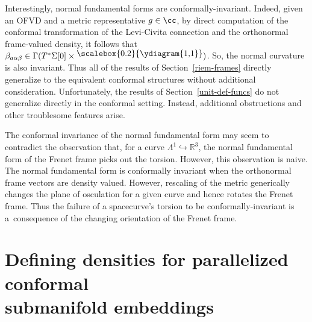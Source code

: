 Interestingly, normal fundamental forms are conformally-invariant. Indeed, given an OFVD and a metric representative $g \in \cc$, by direct computation of the conformal transformation of the Levi-Civita connection and the orthonormal frame-valued density, it follows that $\beta_{a \alpha \beta} \in \Gamma(T^* \Sigma[0] \times \raisebox{3pt}{\scalebox{0.2}{\ydiagram{1,1}}})$. So, the normal curvature is also invariant. Thus all of the results of Section~\ref{riem-frames} directly generalize to the equivalent conformal structures without additional consideration. Unfortunately, the results of Section~\ref{unit-def-funcs} do not generalize directly in the conformal setting. Instead, additional obstructions and other troublesome features arise.

\begin{Remark}
The conformal invariance of the normal fundamental form may seem to contradict the observation that, for a curve $\Lambda^1 \hookrightarrow \mathbb{R}^3$, the normal fundamental form of the Frenet frame picks out the torsion. However, this observation is naive. The normal fundamental form is conformally invariant when the orthonormal frame vectors are density valued. However, rescaling of the metric generically changes the plane of osculation for a given curve and hence rotates the Frenet frame. Thus the failure of a spacecurve's torsion to be conformally-invariant is a~consequence of the changing orientation of the Frenet frame.
\end{Remark}

\section[Defining densities for parallelized conformal submanifold embeddings]{Defining densities for parallelized conformal\\ submanifold embeddings} \label{conf-densities-sec}

